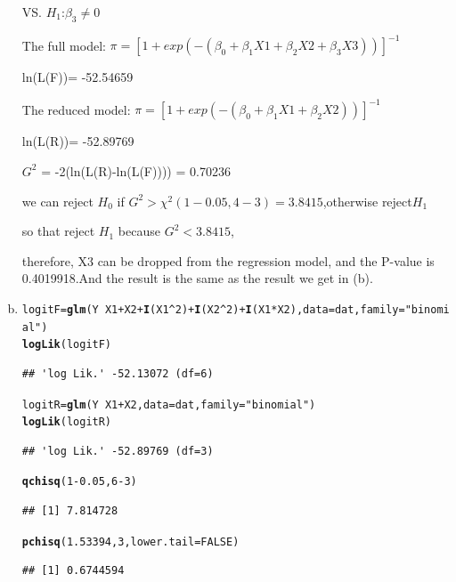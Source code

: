 \documentclass{article}\usepackage[]{graphicx}\usepackage[]{color}
\makeatletter
\newcommand{\hlnum}[1]{\textcolor[rgb]{0.686,0.059,0.569}{#1}}%
\newcommand{\hlstr}[1]{\textcolor[rgb]{0.192,0.494,0.8}{#1}}%
\newcommand{\hlopt}[1]{\textcolor[rgb]{0,0,0}{#1}}%
\newcommand{\hlstd}[1]{\textcolor[rgb]{0.345,0.345,0.345}{#1}}%
\newcommand{\hlkwb}[1]{\textcolor[rgb]{0.69,0.353,0.396}{#1}}%
\newcommand{\hlkwc}[1]{\textcolor[rgb]{0.333,0.667,0.333}{#1}}%
\newcommand{\hlkwd}[1]{\textcolor[rgb]{0.737,0.353,0.396}{\textbf{#1}}}%
\newenvironment{kframe}{%
 \def\at@end@of@kframe{}%
 \ifinner\ifhmode%
  \def\at@end@of@kframe{\end{minipage}}%
  \begin{minipage}{\columnwidth}%
 \fi\fi%
 \def\FrameCommand##1{\hskip\@totalleftmargin \hskip-\fboxsep
 \colorbox{shadecolor}{##1}\hskip-\fboxsep
     \hskip-\linewidth \hskip-\@totalleftmargin \hskip\columnwidth}%
 \MakeFramed {\advance\hsize-\width
   \@totalleftmargin\z@ \linewidth\hsize
   \@setminipage}}%
 {\par\unskip\endMakeFramed%
 \at@end@of@kframe}
\newenvironment{knitrout}{}{} %
\makeatother
\begin{document}
\begin{enumerate}[(a)]
\begin{center}
VS. $H_1$:$\beta_3 \ne 0$

The full model: $\pi = [1 + exp(-(\beta_0 + \beta_1 X1 + \beta_2 X2 + \beta_3 X3))]^{-1} $

ln(L(F))= -52.54659

The reduced model: $\pi = [1 + exp(-(\beta_0 + \beta_1 X1 + \beta_2 X2))]^{-1} $

ln(L(R))= -52.89769

$G^2$ = -2(ln(L(R)-ln(L(F)))) = 0.70236

we can reject $H_0$ if $G^2 > \chi^2(1-0.05, 4-3)=3.8415$,otherwise reject$H_1$

so that reject $H_1$ because $G^2 < 3.8415$,

therefore, X3 can be dropped from the regression model, and the P-value is 0.4019918.And the result is the same as the result we get in (b).
\end{center}

\item

\begin{knitrout}
\color{fgcolor}\begin{kframe}
\begin{alltt}
  \hlstd{logitF} \hlkwb{=} \hlkwd{glm}\hlstd{(Y} \hlopt{~} \hlstd{X1}\hlopt{+}\hlstd{X2}\hlopt{+}\hlkwd{I}\hlstd{(X1}\hlopt{^}\hlnum{2}\hlstd{)}\hlopt{+}\hlkwd{I}\hlstd{(X2}\hlopt{^}\hlnum{2}\hlstd{)}\hlopt{+}\hlkwd{I}\hlstd{(X1}\hlopt{*}\hlstd{X2),} \hlkwc{data} \hlstd{= dat,} \hlkwc{family} \hlstd{=} \hlstr{"binomial"}\hlstd{)}
  \hlkwd{logLik}\hlstd{(logitF)}
\end{alltt}
\begin{verbatim}
## 'log Lik.' -52.13072 (df=6)
\end{verbatim}
\begin{alltt}
  \hlstd{logitR} \hlkwb{=} \hlkwd{glm}\hlstd{(Y} \hlopt{~} \hlstd{X1}\hlopt{+}\hlstd{X2,} \hlkwc{data} \hlstd{= dat,} \hlkwc{family} \hlstd{=} \hlstr{"binomial"}\hlstd{)}
  \hlkwd{logLik}\hlstd{(logitR)}
\end{alltt}
\begin{verbatim}
## 'log Lik.' -52.89769 (df=3)
\end{verbatim}
\begin{alltt}
  \hlkwd{qchisq}\hlstd{(}\hlnum{1}\hlopt{-}\hlnum{0.05}\hlstd{,} \hlnum{6}\hlopt{-}\hlnum{3}\hlstd{)}
\end{alltt}
\begin{verbatim}
## [1] 7.814728
\end{verbatim}
\begin{alltt}
  \hlkwd{pchisq}\hlstd{(}\hlnum{1.53394}\hlstd{,} \hlnum{3}\hlstd{,} \hlkwc{lower.tail} \hlstd{=} \hlnum{FALSE}\hlstd{)}
\end{alltt}
\begin{verbatim}
## [1] 0.6744594
\end{verbatim}
\end{kframe}
\end{knitrout}


\end{enumerate}
\end{document}
